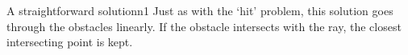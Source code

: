 \documentclass{writeup}
\begin{document}
\begin{solutions}
  \begin{solution}{A straightforward solution}{n}{1}
    Just as with the `hit' problem, this solution goes through the obstacles linearly.
    If the obstacle intersects with the ray, the closest intersecting point is kept.
  \end{solution}
\end{solutions}
\end{document}
